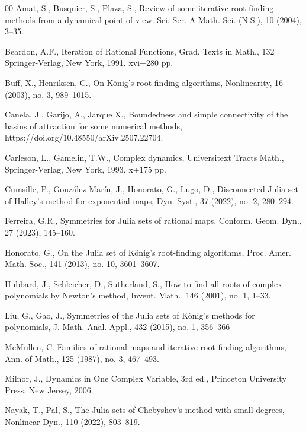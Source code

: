 \documentclass[12pt]{article}
\begin{document}
\begin{thebibliography}{00}
	 Amat, S., Busquier, S., Plaza, S., Review of some iterative root-finding methods
	from a dynamical point of view. Sci. Ser. A Math. Sci. (N.S.), 10 (2004), 3--35.
	
	 Beardon, A.F., Iteration of Rational Functions, Grad. Texts in Math., 132
	Springer-Verlag, New York, 1991. xvi+280 pp.
	
	 Buff, X., Henriksen, C., On K\"{o}nig's root-finding algorithms, Nonlinearity, 16 (2003), no. 3, 989--1015.
	
	 Canela, J., Garijo, A., Jarque X., Boundedness and simple connectivity of the basins of attraction for some numerical methods, https://doi.org/10.48550/arXiv.2507.22704.

     Carleson, L., Gamelin, T.W., Complex dynamics, Universitext Tracts Math., Springer-Verlag, New York, 1993, x+175 pp.

     Cumsille, P., Gonz\'{a}lez-Mar\'{i}n, J., Honorato, G., Lugo, D., Disconnected Julia set of Halley's method for exponential maps, Dyn. Syst., 37 (2022), no. 2, 280--294.


     Ferreira, G.R., Symmetries for Julia sets of rational maps. Conform. Geom. Dyn., 27 (2023), 145--160.
   	
   	 Honorato, G.,
   	On the Julia set of K\"{o}nig's root-finding algorithms,
   	Proc. Amer. Math. Soc., 141 (2013), no. 10, 3601--3607.
   	
	 Hubbard, J., Schleicher, D., Sutherland, S., How to find all roots of complex polynomials by Newton's method, Invent. Math., 146 (2001), no. 1, 1--33.
	
	 Liu, G., Gao, J., Symmetries of the Julia sets of K\"{o}nig's methods for polynomials,
	J. Math. Anal. Appl., 432 (2015), no. 1, 356--366
	
	 McMullen, C. Families of rational maps and iterative root-finding algorithms,
	Ann. of Math., 125 (1987), no. 3, 467--493.
	
	 Milnor, J., Dynamics in One Complex Variable, 3rd ed., Princeton University Press, New Jersey, 2006.
	
	 Nayak, T., Pal, S., The Julia sets of Chebyshev's method with small degrees, Nonlinear Dyn., 110 (2022), 803--819.
	

\end{thebibliography}
\end{document}
